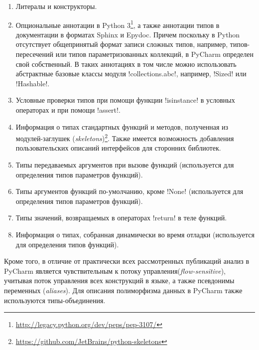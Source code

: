 \begin{enumerate}
    \item Литералы и конструкторы.

    \item Опциональные аннотации в Python
      3\footnote{\url{http://legacy.python.org/dev/peps/pep-3107/}}, а также
      аннотации типов в документации в форматах Sphinx и Epydoc. Причем поскольку в
      Python отсутствует общепринятый формат записи сложных типов, например,
      типов-пересечений или типов параметризованных коллекций, в PyCharm
      определен свой собственный.
      В таких аннотациях в том числе можно использовать абстрактные базовые
      классы модуля !collections.abc!, например, !Sized! или !Hashable!.

    \item Условные проверки типов при помощи функции !isinstance! в условных
      операторах и при помощи !assert!.

    \item Информация о типах стандартных функций и методов, полученная из
        модулей-заглушек
        (\emph{skeletons})\footnote{\url{https://github.com/JetBrains/python-skeletons}}.
        Также имеется возможность добавления пользовательских описаний
        интерфейсов для сторонних библиотек.

    \item Типы передаваемых аргументов при вызове функций (используется для
      определения типов параметров функций).

    \item Типы аргументов функций по-умолчанию, кроме !None! (используется для
      определения типов параметров функций). 

    \item Типы значений, возвращаемых в операторах !return! в теле функций. 

    \item Информация о типах, собранная динамически во время отладки 
      (используется для определения типов функций).

\end{enumerate}

Кроме того, в отличие от практически всех рассмотренных публикаций анализ в
PyCharm является чувствительным к потоку управления(\emph{flow-sensitive}),
учитывая поток управления всех конструкций в языке, а также псевдонимы переменных
(\emph{aliases}). Для описания полиморфизма данных в PyCharm также используются
типы-объединения. 

